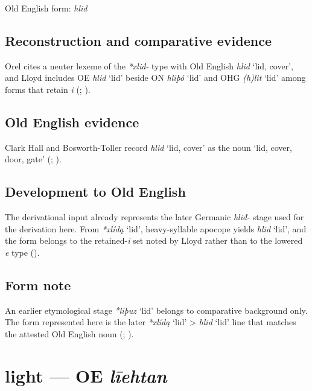 \documentclass[
  british,
  a4paper,
  openany]{book}
\providecommand{\Recon}[1]{\emph{*#1}}
{\catcode`→=\active \global\def→{\ensuremath{\rightarrow}}}
\providecommand{\texorpdfstring}[2]{#1}
\providecommand{\Recon}[1]{\emph{*#1}}
{\catcode`→=\active \global\def→{\ensuremath{\rightarrow}}}
\begin{document}
Old English form: \emph{hlid}

\subsection{Reconstruction and comparative
evidence}\label{reconstruction-and-comparative-evidence-35}

Orel cites a neuter lexeme of the \emph{*xliđ-} type with Old English
{\emph{hlid}} `lid, cover', and Lloyd includes OE \emph{hlid} `lid'
beside ON \emph{hliþó} `lid' and OHG \emph{(h)lit} `lid' among forms
that retain \emph{i} (;
).

\subsection{Old English evidence}\label{old-english-evidence-35}

Clark Hall and Bosworth-Toller record {\emph{hlid}} `lid, cover' as the
noun `lid, cover, door, gate' (; ).

\subsection{Development to Old
English}\label{development-to-old-english-35}

The derivational input already represents the later Germanic
\emph{hliđ-} stage used for the derivation here. From \Recon{xlídą}
`lid', heavy-syllable apocope yields \emph{hlid} `lid', and the form
belongs to the retained-\emph{i} set noted by Lloyd rather than to the
lowered \emph{e} type ().

\subsection{Form note}\label{form-note-11}

An earlier etymological stage \Recon{liþuz} `lid' belongs to comparative
background only. The form represented here is the later \Recon{xlídą}
`lid' \textgreater{} \emph{hlid} `lid' line that matches the attested
Old English noun (;
).

\section{\texorpdfstring{light --- OE
\emph{līehtan}}{light --- OE līehtan}}\label{light-oe-lux12behtan}
\end{document}
